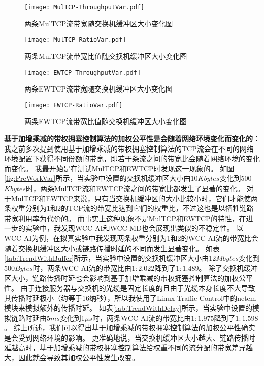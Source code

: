 \documentclass[winfonts]{njuthesis}
\begin{document}
\begin{figure*}[ht]
  \begin{subfigure}{.5\textwidth}
    \centering
		\texttt{[image: MulTCP-ThroughputVar.pdf]}
    \caption{两条MulTCP流带宽随交换机缓冲区大小变化图}
    \label{fig:MulTCP-ThroughputVar}
  \end{subfigure}
	\begin{subfigure}{.5\textwidth}
    \centering
		\texttt{[image: MulTCP-RatioVar.pdf]}
    \caption{两条MulTCP流带宽比值随交换机缓冲区大小变化图}
    \label{fig:MulTCP-RatioVar}
  \end{subfigure}	
	\begin{subfigure}{.5\textwidth}
    \centering
		\texttt{[image: EWTCP-ThroughputVar.pdf]}
    \caption{两条EWTCP流带宽随交换机缓冲区大小变化图}
    \label{fig:EWTCP-ThroughputVar}
  \end{subfigure}
	\begin{subfigure}{.5\textwidth}
    \centering
		\texttt{[image: EWTCP-RatioVar.pdf]}
    \caption{两条EWTCP流带宽比值随交换机缓冲区大小变化图}
    \label{fig:EWTCP-RatioVar}
  \end{subfigure}
	\caption{权重分别为1和2的两条MulTCP和EWTCP流的带宽及其比值随交换机缓冲区大小变化图。}
	\label{fig:PreWorkVar}
\end{figure*}

\textbf{基于加增乘减的带权拥塞控制算法的加权公平性是会随着网络环境变化而变化的：}
我之前多次提到使用基于加增乘减的带权拥塞控制算法的TCP流会在不同的网络环境配置下获得不同份额的带宽，即若干条流之间的带宽比会随着网络环境的变化而变化。
我最开始是在测试MulTCP和EWTCP时发现这一现象的。
如图\ref{fig:PreWorkVar}所示，当实验中设置的交换机缓冲区大小由10$Kbytes$变化到500$Kbytes$时，两条MulTCP流和EWTCP流之间的带宽比都发生了显著的变化。
对于MulTCP和EWTCP来说，只有当交换机缓冲区的大小比较小时，它们才能使两条权重分别为1和2的TCP流的带宽比达到它们的权重比，不过这也是以牺牲链路带宽利用率为代价的。
而事实上这种现象不是MulTCP和EWTCP的特性，在进一步的实验中，我发现WCC-AI和WCC-MD也会展现出类似的不稳定性。
以WCC-AI为例，在拟真实验中我发现两条权重分别为1和2的WCC-AI流的带宽比会随着交换机缓冲区大小或链路传播时延的不同而发生显著变化。
如表\ref{tab:TrendWithBuffer}所示，当实验中设置的交换机缓冲区大小由12$Mbytes$变化到500$Bytes$时，两条WCC-AI流的带宽比由$1:2.022$降到了$1:1.489$。
除了交换机缓冲区大小，链路传播时延也会影响到基于加增乘减的带权拥塞控制算法的加权公平性。
由于连接服务器与交换机的光缆是固定长度的且由于光缆本身长度不大导致其传播时延极小（约等于16纳秒），所以我使用了Linux Traffic Control中的netem模块来模拟额外的传播时延。
如表\ref{tab:TrendWithDelay}所示，当实验中设置的模拟链路时延由5$ms$变化到1$\mu s$时，两条WCC-AI流的带宽比由$1:1.975$降到了$1:1.598$。
综上所述，我们可以得出基于加增乘减的带权拥塞控制算法的加权公平性确实是会受到网络环境的影响。
更准确地说，当交换机缓冲区大小越大、链路传播时延越高时，基于加增乘减的带权拥塞控制算法给权重不同的流分配的带宽差异越大，因此就会导致其加权公平性发生改变。
\end{document}
